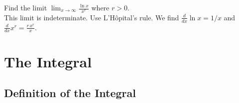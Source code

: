 \documentclass[12pt]{book}
\newenvironment{exercise}[2][Exercise]{\begin{trivlist}
\item[\hskip \labelsep {\bfseries #1}\hskip \labelsep {\bfseries #2.}]}{\end{trivlist}}
\begin{document}
\begin{exercise}{4.4.6}
    Find the limit $\lim_{x \to \infty} \frac{\ln x}{x^r}$ where $r > 0$. \\
    
    This limit is indeterminate. Use L'H\^{o}pital's rule. We find $\frac{d}{dx} \ln x = 1/x$ and $\frac{d}{dx} x^r = \frac{r\, x^r}{x}$.
\end{exercise}



\begin{exercise}{4.4.7}
\end{exercise}


\begin{exercise}{4.4.8}
\end{exercise}


\begin{exercise}{4.4.9}
\end{exercise}


\begin{exercise}{4.4.10}
\end{exercise}


\begin{exercise}{4.4.11}
\end{exercise}

\begin{exercise}{4.4.12}
\end{exercise}


\begin{exercise}{4.4.13}
\end{exercise}


\begin{exercise}{4.4.14}
\end{exercise}

\begin{exercise}{4.4.15}
\end{exercise}

\begin{exercise}{4.4.16}
\end{exercise}



\chapter{The Integral}
\section{Definition of the Integral}
\end{document}

